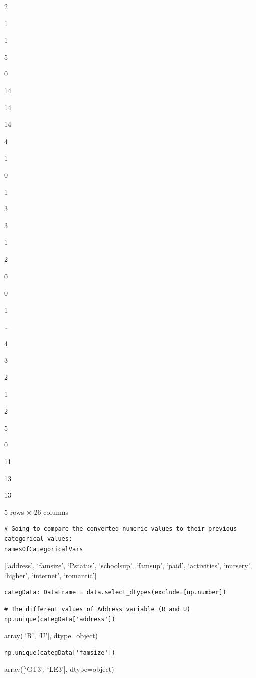 \documentclass[
]{article}
\begin{document}
2

1

1

5

0

14

14

14

4

1

0

1

3

3

1

2

0

0

1

\ldots{}

4

3

2

1

2

5

0

11

13

13

5 rows × 26 columns

\begin{verbatim}
# Going to compare the converted numeric values to their previous categorical values:
namesOfCategoricalVars
\end{verbatim}

{[}`address', `famsize', `Pstatus', `schoolsup', `famsup', `paid',
`activities', `nursery', `higher', `internet', `romantic'{]}

\begin{verbatim}
categData: DataFrame = data.select_dtypes(exclude=[np.number])
\end{verbatim}

\begin{verbatim}
# The different values of Address variable (R and U)
np.unique(categData['address'])
\end{verbatim}

array({[}`R', `U'{]}, dtype=object)

\begin{verbatim}
np.unique(categData['famsize'])
\end{verbatim}

array({[}`GT3', `LE3'{]}, dtype=object)
\end{document}
